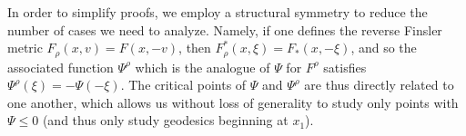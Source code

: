 
In order to simplify proofs, we employ a structural symmetry to reduce the number of cases we need to analyze. Namely, if one defines the reverse Finsler metric $F_\rho(x,v) = F(x,-v)$, then $F_\rho^*(x,\xi) = F_*(x,-\xi)$, and so the associated function $\Psi^\rho$ which is the analogue of $\Psi$ for $F^\rho$ satisfies $\Psi^\rho(\xi) = -\Psi(-\xi)$. The critical points of $\Psi$ and $\Psi^\rho$ are thus directly related to one another, which allows us without loss of generality to study only points with $\Psi \leq 0$ (and thus only study geodesics beginning at $x_1$).

